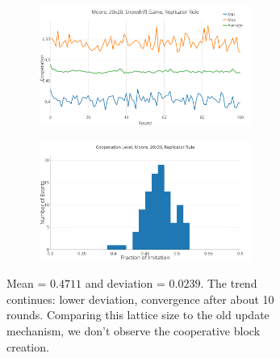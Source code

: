 \documentclass[a4paper, 11pt]{article}
\begin{document}
\begin{figure}[H]
\begin{subfigure}{.55\textwidth}
	\begin{subfigure}{1\textwidth}
		\includegraphics[width=1\linewidth]{SDMoore20x20}
	\end{subfigure}

	\begin{subfigure}{1\textwidth}
		\includegraphics[width=1\linewidth]{SDMoore20x20HG}
	\end{subfigure}
\end{subfigure}%
\begin{subfigure}{.45\textwidth}
	Mean = $0.4711$ and deviation = $0.0239$. The trend continues: lower deviation, convergence after about 10 rounds. Comparing this lattice size to the old update mechanism, we don't observe the cooperative block creation.
\end{subfigure}

\end{figure}





\newpage
\end{document}
